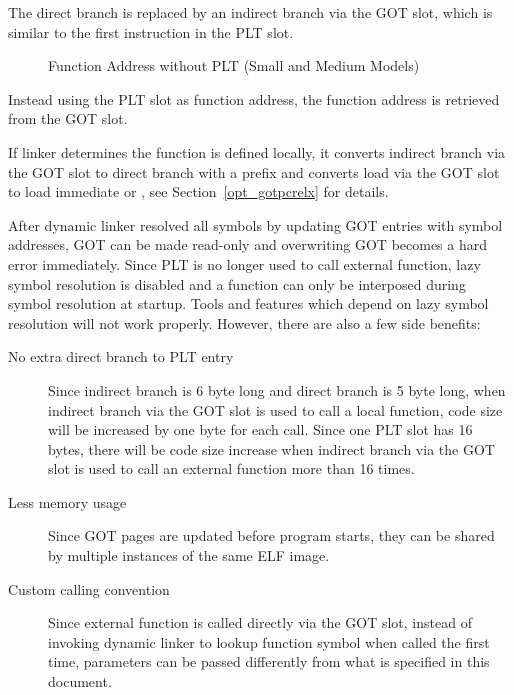The direct branch is replaced by an indirect branch via the GOT slot,
which is similar to the first instruction in the PLT slot.

\begin{figure}[H]
\Hrule
\caption{Function Address without PLT (Small and Medium Models)}
\begin{center}
\small{}
\end{center}
\Hrule
\end{figure}

Instead using the PLT slot as function address, the function address
is retrieved from the GOT slot.

If linker determines the function is defined locally, it converts
indirect branch via the GOT slot to direct branch with a 
prefix and converts load via the GOT slot to load immediate or
, see Section~\ref{opt_gotpcrelx} for details.

After dynamic linker resolved all symbols by updating GOT entries with
symbol addresses, GOT can be made read-only and overwriting GOT becomes
a hard error immediately.  Since PLT is no longer used to call external
function, lazy symbol resolution is disabled and a function can only be
interposed during symbol resolution at startup.  Tools and features which
depend on lazy symbol resolution will not work properly.  However, there
are also a few side benefits:

\begin{description}
\item[No extra direct branch to PLT entry]  Since indirect branch is 6
  byte long and direct branch is 5 byte long, when indirect branch via
  the GOT slot is used to call a local function, code size will be
  increased by one byte for each call.  Since one PLT slot has 16 bytes,
  there will be code size increase when indirect branch via the GOT slot
  is used to call an external function more than 16 times.
\item[Less memory usage] Since GOT pages are updated before program
  starts, they can be shared by multiple instances of the same ELF image.
\item[Custom calling convention]  Since external function is called
  directly via the GOT slot, instead of invoking dynamic linker to
  lookup function symbol when called the first time, parameters can be
  passed differently from what is specified in this document.
\end{description}

